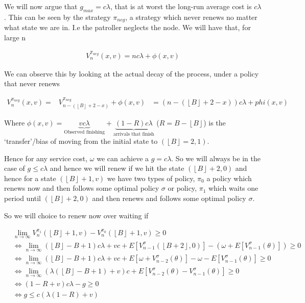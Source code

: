 \documentclass[a4paper,10pt]{article}
\newcommand{\floor}[1]{\left \lfloor #1 \right \rfloor}
\theoremstyle{definition}
\theoremstyle{definition}
\theoremstyle{remark}
\theoremstyle{definition}
\begin{document}
We will now argue that $g_{max}=c \lambda$, that is at worst the  long-run average cost is $c \lambda$. This can be seen by the strategy $\pi_{neg}$, a strategy which never renews no matter what state we are in. I.e the patroller neglects the node. We will have that, for large n

\begin{align*}
V_{n}^{\pi_{neg}}(x,v)=n c \lambda + \phi(x,v)
\end{align*}

We can observe this by looking at the actual decay of the process, under a policy that never renews

\begin{align*}
V_{n}^{\pi_{neg}}(x,v)=& V_{n-(\floor{B}+2-x)}^{\pi_{neg}} + \phi(x,v)
&=(n-(\floor{B}+2-x)) c \lambda + phi(x,v)
\end{align*}

Where $\phi(x,v)= \underbrace{v c \lambda}_{\text{Observed finishing}} + \underbrace{(1-R) c \lambda}_{\text{arrivals that finish}}$ ($R=B-\floor{B}$) is the `transfer'/bias of moving from the initial state to $(\floor{B}=2,1)$.

Hence for any service cost, $\omega$ we can achieve a $g= c \lambda$. So we will always be in the case of $g \leq c \lambda$ and hence we will renew if we hit the state $(\floor{B}+2,0)$ and hence for a state $(\floor{B}+1,v)$ we have two types of policy, $\pi_{0}$ a policy which renews now and then follows some optimal policy $\sigma$ or policy, $\pi_{1}$ which waits one period until $(\floor{B}+2,0)$ and then renews and follows some optimal policy $\sigma$.

So we will choice to renew now over waiting if

\begin{align*}
&\lim\limits_{n \rightarrow \infty} V_{n}^{\pi_{1}} (\floor{B}+1,v) - V_{n}^{\pi_{0}}(\floor{B}+1,v) \geq 0 \\
& \iff \lim\limits_{n \rightarrow \infty} (\floor{B}-B+1) c \lambda + v c + E[V_{n-1}^{\sigma}(\floor{B+2},0)] - (\omega + E[V_{n-1}^{\sigma}(\theta)]) \geq 0 \\
& \iff \lim\limits_{n \rightarrow \infty} (\floor{B}-B+1) c \lambda + v c  + E[ \omega + V_{n-2}^{\sigma}(\theta)] - \omega - E[V_{n-1}^{\sigma}(\theta)] \geq 0 \\
& \iff \lim\limits_{n \rightarrow \infty} (\lambda(\floor{B}-B+1)+v) c + E[V_{n-2}^{\sigma}(\theta) - V_{n-1}^{\sigma}(\theta)] \geq 0 \\
& \iff (1-R+v)c \lambda - g \geq 0 \\
& \iff g \leq c (\lambda(1-R)+v) 
\end{align*}
\end{document}
